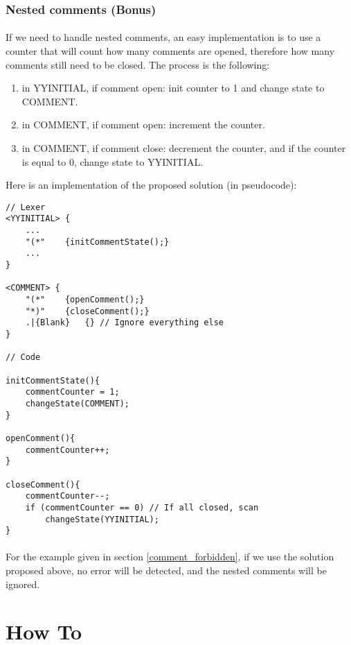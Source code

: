 \documentclass[letterpaper]{article}
\begin{document}
\subsubsection{Nested comments (Bonus)}

\paragraph{}
If we need to handle nested comments, an easy implementation is to use a
counter that will count how many comments are opened, therefore how many
comments still need to be closed. The process is the following:
\begin{enumerate}
    \item in YYINITIAL, if comment open: init counter to 1 and change state
    to COMMENT.
    \item in COMMENT, if comment open: increment the counter.
    \item in COMMENT, if comment close: decrement the counter, and
    if the counter is equal to 0, change state to YYINITIAL.
\end{enumerate}

Here is an implementation of the proposed solution (in pseudocode): \\
\begin{lstlisting}[frame=single]
// Lexer
<YYINITIAL> {
    ...
    "(*"    {initCommentState();}
    ...
}

<COMMENT> {
    "(*"    {openComment();}
    "*)"    {closeComment();}
    .|{Blank}   {} // Ignore everything else
}

// Code

initCommentState(){
    commentCounter = 1;
    changeState(COMMENT);
}

openComment(){
    commentCounter++;
}

closeComment(){
    commentCounter--;
    if (commentCounter == 0) // If all closed, scan
        changeState(YYINITIAL);
}

\end{lstlisting}

\paragraph{}
For the example given in section \ref{comment_forbidden}, if we use the
solution proposed above, no error will be detected, and the nested
comments will be ignored.

\section{How To}
\end{document}

